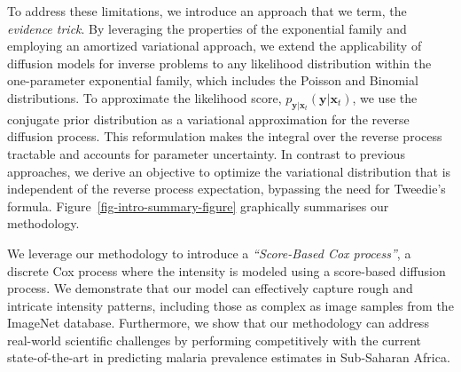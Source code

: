 To address these limitations, we introduce an approach that we term, the \textit{evidence trick}. By leveraging the properties of the exponential family and employing an amortized variational approach, we extend the applicability of diffusion models for inverse problems to any likelihood distribution within the one-parameter exponential family, which includes the Poisson and Binomial distributions. 
To approximate the likelihood score, $p_{\mathbf{y}|\mathbf{x}_t}(\mathbf{y}|\mathbf{x}_t)$, we use the conjugate prior distribution as a variational approximation for the reverse diffusion process. This reformulation makes the integral over the reverse process tractable and accounts for parameter uncertainty. In contrast to previous approaches, we derive an objective to optimize the variational distribution that is independent of the reverse process expectation, bypassing the need for Tweedie's formula. Figure~\ref{fig-intro-summary-figure} graphically summarises our methodology.


We leverage our methodology to introduce a \textit{``Score-Based Cox process''}, a discrete Cox process where the intensity is modeled using a score-based diffusion process. We demonstrate that our model can effectively capture rough and intricate intensity patterns, including those as complex as image samples from the ImageNet database. Furthermore, we show that our methodology can address real-world scientific challenges by performing competitively with the current state-of-the-art in predicting malaria prevalence estimates in Sub-Saharan Africa.








